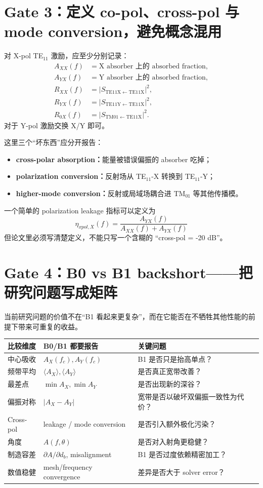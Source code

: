 \documentclass[11pt,a4paper,openany]{ctexrep}
\begin{document}
\section{Gate 3：定义 co-pol、cross-pol 与 mode conversion，避免概念混用}

对 X-pol TE$_{11}$ 激励，应至少分别记录：
\begin{align*}
A_{XX}(f)&=\text{X absorber 上的 absorbed fraction},\\
A_{YX}(f)&=\text{Y absorber 上的 absorbed fraction},\\
R_{XX}(f)&=|S_{\mathrm{TE11X}\leftarrow\mathrm{TE11X}}|^2,\\
R_{YX}(f)&=|S_{\mathrm{TE11Y}\leftarrow\mathrm{TE11X}}|^2,\\
R_{0X}(f)&=|S_{\mathrm{TM01}\leftarrow\mathrm{TE11X}}|^2.
\end{align*}
对于 Y-pol 激励交换 X/Y 即可。

这里三个“坏东西”应分开报告：
\begin{itemize}
  \item \textbf{cross-polar absorption：}能量被错误偏振的 absorber 吃掉；
  \item \textbf{polarization conversion：}反射场从 TE$_{11}$-X 转换到 TE$_{11}$-Y；
  \item \textbf{higher-mode conversion：}反射或局域场耦合进 TM$_{01}$ 等其他传播模。
\end{itemize}

一个简单的 polarization leakage 指标可以定义为
\[
\boxed{
\eta_{xpol,X}(f)=
\frac{A_{YX}(f)}{A_{XX}(f)+A_{YX}(f)}
}
\]
但论文里必须写清楚定义，不能只写一个含糊的 ``cross-pol = -20 dB''。

\section{Gate 4：B0 vs B1 backshort——把研究问题写成矩阵}

当前研究问题的价值不在“B1 看起来更复杂”，而在它能否在不牺牲其他性能的前提下带来可重复的收益。

\begin{center}
\begin{tabularx}{\textwidth}{p{3.3cm}X X}
\toprule
比较维度 & B0/B1 都要报告 & 关键问题 \\
\midrule
中心吸收 & $A_X(f_c),A_Y(f_c)$ & B1 是否只是抬高单点？ \\
频带平均 & $\langle A_X\rangle,\langle A_Y\rangle$ & 是否真正宽带改善？ \\
最差点 & $\min A_X,\min A_Y$ & 是否出现新的深谷？ \\
偏振对称 & $|A_X-A_Y|$ & 宽带是否以破坏双偏振一致性为代价？ \\
Cross-pol & leakage / mode conversion & 是否引入额外极化污染？ \\
角度 & $A(f,\theta)$ & 是否对入射角更稳健？ \\
制造容差 & $\partial A/\partial d_b$, misalignment & B1 是否过度依赖精密加工？ \\
数值稳健 & mesh/frequency convergence & 差异是否大于 solver error？ \\
\bottomrule
\end{tabularx}
\end{center}
\end{document}
